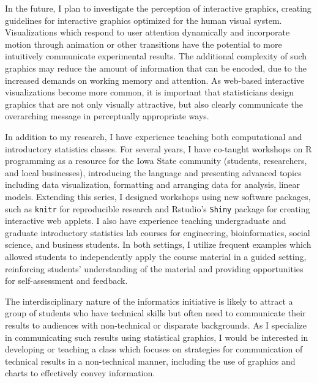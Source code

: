 \documentclass[11pt,letterpaper,sans,unicode]{moderncv}        %
\begin{document}
In the future, I plan to investigate the perception of interactive graphics, creating guidelines for interactive graphics optimized for the human visual system. Visualizations which respond to user attention dynamically and incorporate motion through animation or other transitions have the potential to more intuitively communicate experimental results. The additional complexity of such graphics may reduce the amount of information that can be encoded, due to the increased demands on working memory and attention. As web-based interactive visualizations become more common, it is important that statisticians design graphics that are not only visually attractive, but also clearly communicate the overarching message in perceptually appropriate ways.


In addition to my research, I have experience teaching both computational and introductory statistics classes. For several years, I have co-taught workshops on R programming as a resource for the Iowa State community (students, researchers, and local businesses), introducing the language and presenting advanced topics including data visualization, formatting and arranging data for analysis, linear models. Extending this series, I designed workshops using new software packages, such as \texttt{knitr} for reproducible research and Rstudio's \texttt{Shiny} package for creating interactive web applets. I also have experience teaching undergraduate and graduate introductory statistics lab courses for engineering, bioinformatics, social science, and business students. In both settings, I utilize frequent examples which allowed students to independently apply the course material in a guided setting, reinforcing students' understanding of the material and providing opportunities for self-assessment and feedback.

The interdisciplinary nature of the informatics initiative is likely to attract a group of students who have technical skills but often need to communicate their results to audiences with non-technical or disparate backgrounds. As I specialize in communicating such results using statistical graphics, I would be interested in developing or teaching a class which focuses on strategies for communication of technical results in a non-technical manner, including the use of graphics and charts to effectively convey information.
\end{document}
